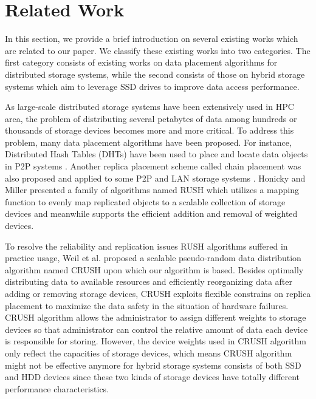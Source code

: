 \section{Related Work}
\label{sec:relatedwork}

In this section, we provide a brief introduction on several existing works
which are related to our paper. We classify these existing works into two
categories. The first category consists of existing works on data placement
algorithms for distributed storage systems, while the second consists of those
on hybrid storage systems which aim to leverage SSD drives to improve data
access performance.

As large-scale distributed storage systems have been extensively used in HPC
area, the problem of distributing several petabytes of data among hundreds or
thousands of storage devices becomes more and more critical. To address this
problem, many data placement algorithms have been proposed. For instance,
Distributed Hash Tables (DHTs) have been used to place and locate data objects
in P2P systems \cite{Stoica2001, Ratnasamy2001, Cai2004}. Another replica
placement scheme called chain placement was also proposed and applied to some
P2P and LAN storage systems \cite{Rowstron2001, Lee1996, MacCormick2004}.
Honicky and Miller presented a family of algorithms named RUSH
\cite{honicky04} which utilizes a mapping function to evenly map replicated
objects to a scalable collection of storage devices and meanwhile supports the
efficient addition and removal of weighted devices.

To resolve the reliability and replication issues RUSH algorithms suffered in
practice usage, Weil et al. proposed a scalable pseudo-random data
distribution algorithm named CRUSH \cite{Weil2006} upon which our algorithm is
based. Besides optimally distributing data to available resources and
efficiently reorganizing data after adding or removing storage devices, CRUSH
exploits flexible constrains on replica placement to maximize the data safety
in the situation of hardware failures. CRUSH algorithm allows the
administrator to assign different weights to storage devices so that
administrator can control the relative amount of data each device is
responsible for storing. However, the device weights used in CRUSH algorithm
only reflect the capacities of storage devices, which means CRUSH algorithm
might not be effective anymore for hybrid storage systems consists of both SSD
and HDD devices since these two kinds of storage devices have totally
different performance characteristics.

